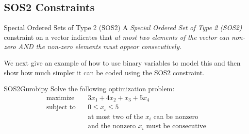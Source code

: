 \subsection{SOS2 Constraints}
\begin{definition}{Special Ordered Sets of Type 2 (SOS2)}{}
A \emph{Special Ordered Set of Type 2 (SOS2)} constraint on a vector indicates that \emph{at most two elements of the vector can non-zero AND the non-zero elements must appear consecutively}.
\end{definition}
We next give an example of how to use binary variables to model this and then show how much simpler it can be coded using the SOS2 constraint.
\begin{examplewithcode}{SOS2}{\href{https://github.com/open-optimization/open-optimization-or-examples/blob/master/nonlinear-programming/Gurobi-SOS-Examples.ipynb}{Gurobipy}}
\label{example:SOS2}
Solve the following optimization problem: \[\begin{aligned}
\text{maximize}\quad & 3x_1 + 4x_2 + x_3 + 5x_4 \\
\text{subject to}\quad & 0 \le x_i \le 5 \\
& \text{at most two of the $x_i$ can be nonzero} \\
& \text{and the nonzero $x_i$ must be consecutive}
\end{aligned}\]
\end{examplewithcode}


